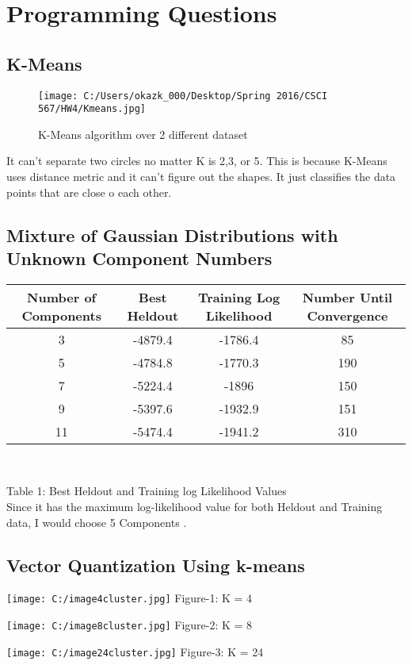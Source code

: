 \documentclass[letter,11pt]{article}
\begin{document}
	 \section{Programming Questions}
	 \subsection{K-Means}
	 	\begin{figure}[H]%
	 	\centering
	 	\texttt{[image: C:/Users/okazk\_000/Desktop/Spring 2016/CSCI 567/HW4/Kmeans.jpg]}
	 	\caption{K-Means algorithm over 2 different dataset}
	 	\label{fig:test}
	 	\end{figure}
	 	
	 	It can't separate two circles no matter K is 2,3, or 5. This is because K-Means uses distance metric and it can't figure out the shapes. It just classifies the data points that are close o each other.
	 
	 \subsection{Mixture of Gaussian Distributions with Unknown Component Numbers} 
	
			\begin{center}
			\begin{tabular}{|c| c |c |c|} 
				\hline
				Number of Components & Best Heldout & Training Log Likelihood & Number Until Convergence \\ [0.5ex] 
				\hline
				3 & -4879.4 & -1786.4 & 85 \\ 
				\hline
				5 & -4784.8 & -1770.3 & 190 \\
				\hline
				7 & -5224.4 & -1896 & 150 \\
				\hline
				9 & -5397.6 & -1932.9 & 151 \\
				\hline
				11 & -5474.4 & -1941.2 & 310 \\
				\hline
			\end{tabular} \\

		\end{center}
			
				Table 1: Best Heldout and Training log Likelihood Values\\
		
				Since it has the maximum log-likelihood value for both Heldout and Training data, I would choose 5 Components .
			 \subsection{Vector Quantization Using k-means} 
			 \noindent
			 \parbox{2cm}{}%
			 \hfill
			 \texttt{[image: C:/image4cluster.jpg]}
			 \centering
			 Figure-1: K = 4
			 \noindent
			 \parbox{0.5cm}{}%
			 \hfill
			 \texttt{[image: C:/image8cluster.jpg]}
			 \centering
			 Figure-2: K = 8	
			 \noindent
			 \parbox{0.5cm}{}%
			 \hfill
			 \texttt{[image: C:/image24cluster.jpg]}
			 \centering
			 Figure-3: K = 24			 


								
\end{document}
